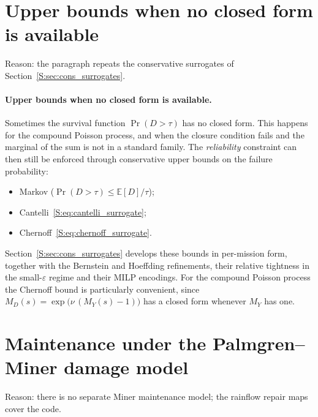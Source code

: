 \documentclass[11pt,a4paper]{article}
\theoremstyle{plain}
\theoremstyle{definition}
\theoremstyle{remark}
\begin{document}
\section{Upper bounds when no closed form is available}

Reason: the paragraph repeats the conservative surrogates of Section~\ref{S:sec:cons_surrogates}.

\paragraph{Upper bounds when no closed form is available.}
Sometimes the survival function $\Pr(D > \tau)$ has no closed form.
This happens for the compound Poisson process, and when the closure condition fails and the marginal of the sum is not in a standard family.
The \emph{reliability} constraint can then still be enforced through conservative upper bounds on the failure probability:
\begin{itemize}
  \item Markov ($\Pr(D > \tau) \le \mathbb{E}[D]/\tau$);
  \item Cantelli~\eqref{S:eq:cantelli_surrogate};
  \item Chernoff~\eqref{S:eq:chernoff_surrogate}.
\end{itemize}
Section~\ref{S:sec:cons_surrogates} develops these bounds in per-mission form, together with the Bernstein and Hoeffding refinements, their relative tightness in the small-$\varepsilon$ regime and their MILP encodings.
For the compound Poisson process the Chernoff bound is particularly convenient, since $M_D(s) = \exp\bigl(\nu\,(M_Y(s)-1)\bigr)$ has a closed form whenever $M_Y$ has one.


\section{Maintenance under the Palmgren--Miner damage model}

Reason: there is no separate Miner maintenance model; the rainflow repair maps cover the code.
\end{document}
